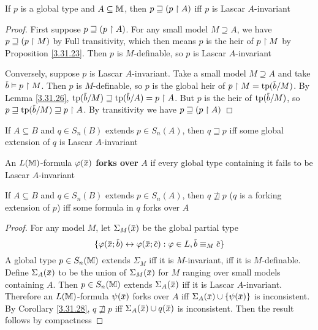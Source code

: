 \documentclass[11pt]{article}
\begin{document}
\begin{proposition}
If \(p\) is a global type and \(A\subseteq\mathbb{M}\), then \(p\sqsupseteq(p\upharpoonright A)\) iff \(p\) is Lascar \(A\)-invariant
\end{proposition}

\begin{proof}
First suppose \(p\sqsupseteq(p\upharpoonright A)\). For any small model \(M\supseteq A\), we have \(p\sqsupseteq(p\upharpoonright M)\) by Full
transitivity, which then means \(p\) is the heir of \(p\upharpoonright M\) by Proposition \ref{3.31.23}.
Then \(p\) is \(M\)-definable, so \(p\) is Lascar \(A\)-invariant

Conversely, suppose \(p\) is Lascar \(A\)-invariant. Take a small model \(M\supseteq A\) and
take \(\barb\vDash p\uhr M\). Then \(p\) is \(M\)-definable, so \(p\) is the global heir
of \(p\uhr M=\tp(\barb/M)\). By Lemma \ref{3.31.26}, \(\tp(\barb/M)\sqsupseteq\tp(\barb/A)=p\uhr A\).
But \(p\) is the heir of \(\tp(\barb/M)\), so \(p\sqsupseteq\tp(\barb/M)\sqsupseteq p\uhr A\). By transitivity we
have \(p\sqsupseteq(p\upharpoonright A)\)
\end{proof}

\begin{corollary}[]
\label{3.31.28}
If \(A\subseteq B\) and \(q\in S_n(B)\) extends \(p\in S_n(A)\), then \(q\sqsupseteq p\) iff some global extension
of \(q\) is Lascar \(A\)-invariant
\end{corollary}

\begin{definition}[]
An \(L(\mathbb{M})\)-formula \(\varphi(\barx)\) \textbf{forks over} \(A\) if every global type containing it fails to be
Lascar \(A\)-invariant
\end{definition}

\begin{proposition}
If \(A\subseteq B\) and \(q\in S_n(B)\) extends \(p\in S_n(A)\), then \(q\not\sqsupseteq p\) (\(q\) is a forking
extension of \(p\)) iff some formula in \(q\)
forks over \(A\)
\end{proposition}

\begin{proof}
For any model \(M\), let \(\Sigma_M(\barx)\) be the global partial type
\begin{equation*}
\{\varphi(\barx;\barb)\leftrightarrow\varphi(\barx;\barc):\varphi\in L,\barb\equiv_M\barc\}
\end{equation*}
A global type \(p\in S_n(\mathbb{M})\) extends \(\Sigma_M\) iff it is \(M\)-invariant, iff it
is \(M\)-definable. Define \(\Sigma_A(\barx)\) to be the union of \(\Sigma_M(\barx)\) for \(M\) ranging
over small models containing \(A\). Then \(p\in S_n(\mathbb{M})\) extends \(\Sigma_A(\barx)\) iff it is
Lascar \(A\)-invariant. Therefore an \(L(\mathbb{M})\)-formula \(\psi(\barx)\) forks over \(A\)
iff \(\Sigma_A(\barx)\cup\{\psi(\barx)\}\) is inconsistent. By Corollary \ref{3.31.28}, \(q\not\sqsupseteq p\)
iff \(\Sigma_A(\barx)\cup q(\barx)\) is inconsistent. Then the result follows by compactness
\end{proof}
\end{document}
